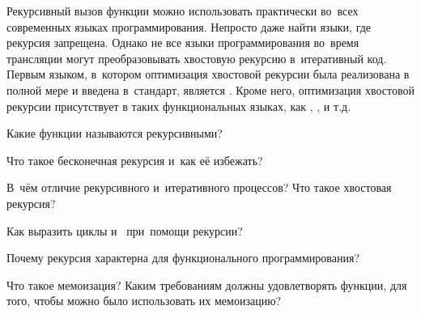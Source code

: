 Рекурсивный вызов функции можно использовать практически во~всех современных языках программирования. Непросто даже найти языки, где рекурсия запрещена. Однако не все языки программирования во~время трансляции могут преобразовывать хвостовую рекурсию в~итеративный код. Первым языком, в~котором оптимизация хвостовой рекурсии была реализована в полной мере и введена в~стандарт, является . Кроме него, оптимизация хвостовой рекурсии присутствует в таких функциональных языках, как , ,  и т.д.

\begin{Queeze}

  \item Какие функции называются рекурсивными?

  \item Что такое бесконечная рекурсия и~как её избежать?

  \item В~чём отличие рекурсивного и~итеративного процессов? Что такое хвостовая рекурсия?

  \item Как выразить циклы  и~ при~помощи рекурсии?

  \item Почему рекурсия характерна для функционального программирования?

  \item Что такое мемоизация? Каким требованиям должны удовлетворять функции, для того, чтобы можно было использовать их мемоизацию?
\end{Queeze}

